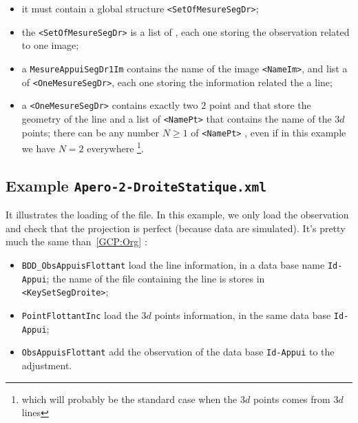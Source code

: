 \begin{itemize}
   \item it must contain a global structure {\tt <SetOfMesureSegDr>};
   \item the {\tt <SetOfMesureSegDr>} is a list of {\tt <MesureAppuiSegDr1Im>}, each one
         storing the observation related to one image;
   \item a  {\tt MesureAppuiSegDr1Im} contains the name of the image {\tt <NameIm>},  and list a of {\tt <OneMesureSegDr>}, each one storing the information related the a line;

   \item a   {\tt <OneMesureSegDr>} contains exactly two $2$ point {\tt <Pt1Im>} and {\tt <Pt2Im>} that store 
            the geometry of the line and a list of {\tt <NamePt>} that contains the name of the $3d$ points; 
            there can be any number $N \geq 1$ of  {\tt <NamePt>} , even if in this example we 
             have $N=2$ everywhere 
             \footnote{which will probably be the standard case when the $3d$ points comes from $3d$ lines}.

\end{itemize}


\subsection{Example {\tt Apero-2-DroiteStatique.xml}}

\label{Apero-2-DroiteStatique}

It illustrates the loading of the file.
In this example, we only load the observation and check that the projection is perfect (because data
are simulated). It's pretty much the same than~\ref{GCP:Org} :

\begin{itemize}
   \item {\tt BDD\_ObsAppuisFlottant} load the line information, in a data base name {\tt Id-Appui};
         the name of the file containing the line is stores in {\tt  <KeySetSegDroite>};
   \item {\tt PointFlottantInc} load the $3d$ points information, in the same data base {\tt Id-Appui};
   \item {\tt ObsAppuisFlottant} add the observation of the data base {\tt Id-Appui} to the adjustment.
\end{itemize}

